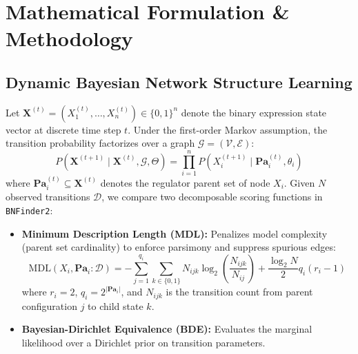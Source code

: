 \documentclass[11pt,a4paper]{article}
\begin{document}
\section{Mathematical Formulation \& Methodology}

\subsection{Dynamic Bayesian Network Structure Learning}
Let $\mathbf{X}^{(t)} = (X_1^{(t)}, \dots, X_n^{(t)}) \in \{0, 1\}^n$ denote the binary expression state vector at discrete time step $t$. Under the first-order Markov assumption, the transition probability factorizes over a graph $\mathcal{G} = (\mathcal{V}, \mathcal{E})$:
\begin{equation}
P\left(\mathbf{X}^{(t+1)} \mid \mathbf{X}^{(t)}, \mathcal{G}, \Theta\right) = \prod_{i=1}^{n} P\left(X_i^{(t+1)} \mid \mathbf{Pa}_i^{(t)}, \theta_i\right)
\end{equation}
where $\mathbf{Pa}_i^{(t)} \subseteq \mathbf{X}^{(t)}$ denotes the regulator parent set of node $X_i$. Given $N$ observed transitions $\mathcal{D}$, we compare two decomposable scoring functions in \texttt{BNFinder2}:
\begin{itemize}
    \item \textbf{Minimum Description Length (MDL):} Penalizes model complexity (parent set cardinality) to enforce parsimony and suppress spurious edges:
    \begin{equation}
    \text{MDL}(X_i, \mathbf{Pa}_i : \mathcal{D}) = -\sum_{j=1}^{q_i} \sum_{k \in \{0,1\}} N_{ijk} \log_2 \left( \frac{N_{ijk}}{N_{ij}} \right) + \frac{\log_2 N}{2} q_i (r_i - 1)
    \end{equation}
    where $r_i = 2$, $q_i = 2^{|\mathbf{Pa}_i|}$, and $N_{ijk}$ is the transition count from parent configuration $j$ to child state $k$.
    \item \textbf{Bayesian-Dirichlet Equivalence (BDE):} Evaluates the marginal likelihood over a Dirichlet prior on transition parameters.
\end{itemize}
\end{document}
